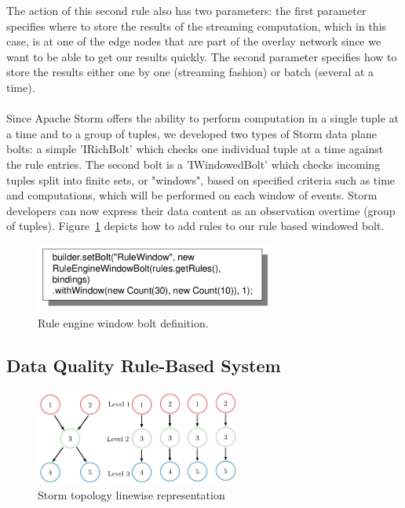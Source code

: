 The action of this second rule also has two parameters: the first parameter specifies where to store the results of the streaming computation, which in this case, is at one of the edge nodes that are part of the overlay network since we want to be able to get our results quickly. The second parameter specifies how to store the results either one by one (streaming fashion) or batch (several at a time).
\\
\\
Since Apache Storm offers the ability to perform computation in a single tuple at a time and to a group of tuples, we developed two types of Storm data plane bolts: a simple 'IRichBolt' which checks one individual tuple at a time against the rule entries. The second bolt is a 'IWindowedBolt' which checks incoming tuples split into finite sets, or "windows", based on specified criteria such as time and computations, which will be performed on each window of events. Storm developers can now express their data content as an observation overtime (group of tuples). Figure~\ref{fig:WindowBolt} depicts how to add rules to our rule based windowed bolt.

\begin{figure}[h!]
  \centering
  \includegraphics[width=0.7\textwidth]{Figures/WindowBolt.pdf}
  \caption{Rule engine window bolt definition.}
  \label{fig:WindowBolt}
\end{figure}

\subsection{Data Quality Rule-Based System}

\begin{figure}[h!]
  \centering
  \includegraphics[width=0.6\textwidth]{Figures/AlgoImg.pdf}
  \caption{Storm topology linewise representation}
  \label{fig:AlgoImg}
\end{figure}

